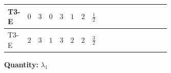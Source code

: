 \documentclass[8pt]{article}
\begin{document}
\begin{landscape}
\begin{longtable}{@{}llcccccc >{\raggedright\arraybackslash}p{0.21\linewidth} >{\raggedright\arraybackslash}p{0.21\linewidth} >{\raggedright\arraybackslash}p{0.21\linewidth}@{}}
\midrule
T3-E & $0$ & $3$ & $0$ & $3$ & $1$ & $2$ & $\frac{1}{2}$ & \scriptsize\adjustbox{max width=\linewidth}{$\begin{gathered} +{g_1}^2 \left(\frac{3 {g_2}^2}{2}-3 {\lambda_1}\right)\end{gathered}$} & \scriptsize\adjustbox{max width=\linewidth}{$\begin{gathered} -9 {g_2}^2 {\lambda_1}\end{gathered}$} & \scriptsize\adjustbox{max width=\linewidth}{$\begin{gathered} +\frac{3 {g_1}^4}{4}\end{gathered}$} \\
\midrule
T3-E & $2$ & $3$ & $1$ & $3$ & $2$ & $2$ & $\frac{3}{2}$ & \scriptsize\adjustbox{max width=\linewidth}{$\begin{gathered} +{g_1}^2 \left(\frac{3 {g_2}^2}{2}-3 {\lambda_1}\right)\end{gathered}$} & \scriptsize\adjustbox{max width=\linewidth}{$\begin{gathered} -9 {g_2}^2 {\lambda_1}\end{gathered}$} & \scriptsize\adjustbox{max width=\linewidth}{$\begin{gathered} +\frac{3 {g_1}^4}{4}\end{gathered}$} \\
\midrule
\bottomrule
\end{longtable}
\clearpage
\noindent\textbf{Quantity: }$\lambda_1$\par\smallskip

\end{landscape}
\end{document}
